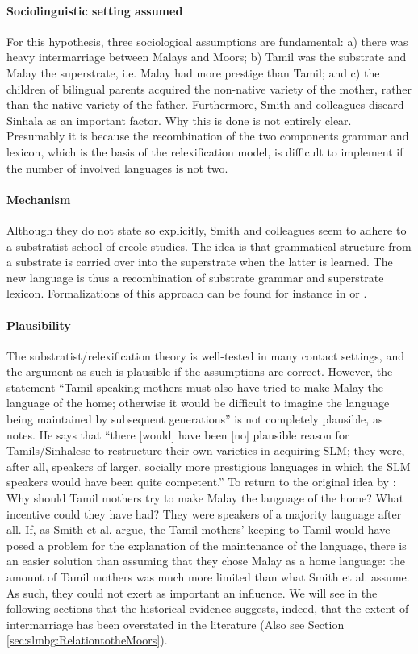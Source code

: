 \paragraph{Sociolinguistic setting assumed}
For this hypothesis, three sociological assumptions are fundamental: a) there was heavy intermarriage between Malays and Moors; b) Tamil was the substrate and Malay the superstrate, i.e. Malay had more prestige than Tamil; and  c) the children of bilingual parents acquired the non-native variety of the mother, rather than the native variety of the father. Furthermore, Smith and colleagues discard Sinhala as an important factor. Why this is done is not entirely clear. Presumably it is  because the recombination of the two components grammar and lexicon, which is the basis of the relexification model, is difficult to implement if the number of involved languages is not two.

\paragraph{Mechanism}
Although they do not state so explicitly, Smith and colleagues seem to adhere to a substratist school of creole studies. The idea is that grammatical structure from a substrate is carried over into the superstrate when the latter is learned. The new language is thus a recombination of substrate grammar and superstrate lexicon. Formalizations of this approach can be found for instance in \citet{Muysken1981} or \citet{Lefebvre2001}.

\paragraph{Plausibility}
The substratist/relexification theory is well-tested in many contact settings, and the argument as such is plausible if the assumptions are correct. However, the statement ``Tamil-speaking mothers must also have tried to make Malay the language of the home; otherwise it would be difficult to imagine the language being maintained by subsequent generations'' \citep[177]{SmithEtAl2006cll} is not completely plausible, as \citet{Ansaldo2008genesis} notes. He says that ``there [would] have been [no]  plausible reason for
Tamils/Sinhalese to restructure their own varieties in acquiring SLM; they were,
after all, speakers of larger, socially more prestigious languages in which the SLM
speakers would have been quite competent.'' To return to the original idea by \citet{SmithEtAl2006cll}: Why should Tamil mothers try to make Malay the language of the home? What incentive could they have had? They were speakers of a majority language after all. If, as Smith et al. argue, the Tamil mothers' keeping to Tamil would have posed a problem for the explanation of the maintenance of the language, there is an easier solution than assuming that they chose Malay as a home language: the amount of Tamil mothers was much more limited than what Smith et al. assume. As such, they could not exert as  important an influence. We will see in the following sections that the historical evidence suggests, indeed, that the extent of intermarriage has been overstated in the literature  (Also see Section \ref{sec:slmbg:RelationtotheMoors}).

